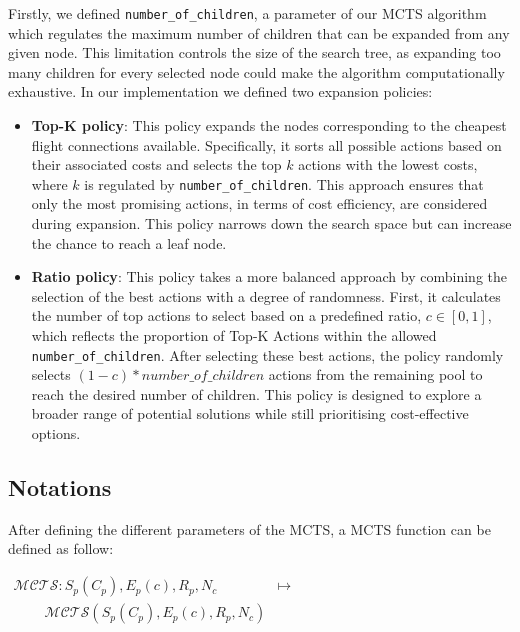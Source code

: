 \documentclass[conference]{IEEEtran}
\begin{document}
Firstly, we defined \texttt{number\_of\_children}, a parameter of our MCTS algorithm which regulates the maximum number of children that can be expanded from any given node. This limitation controls the size of the search tree, as expanding too many children for every selected node could make the algorithm computationally exhaustive. In our implementation we defined two expansion policies:

\begin{itemize}
    \item \textbf{Top-K policy}: This policy expands the nodes corresponding to the cheapest flight connections available. Specifically, it sorts all possible actions based on their associated costs and selects the top \(k\) actions with the lowest costs, where \(k\) is regulated by \texttt{number\_of\_children}. This approach ensures that only the most promising actions, in terms of cost efficiency, are considered during expansion. This policy narrows down the search space but can increase the chance to reach a leaf node.
    \item \textbf{Ratio policy}: This policy takes a more balanced approach by combining the selection of the best actions with a degree of randomness. First, it calculates the number of top actions to select based on a predefined ratio, \(c \in [0,1]\), which reflects the proportion of Top-K Actions within the allowed \texttt{number\_of\_children}. After selecting these best actions, the policy randomly selects $(1-c)*number\_of\_children$ actions from the remaining pool to reach the desired number of children. This policy is designed to explore a broader range of potential solutions while still prioritising cost-effective options.
\end{itemize}

\subsection{Notations}
\label{sub:notations}

After defining the different parameters of the MCTS, a MCTS function can be defined as follow:

\begin{center}
    \centering
    $\begin{array}{cc}
            \mathcal{MCTS} : S_p(C_p), E_p(c), R_p, N_c & \mapsto \\ ~~~~~~~~~~ \mathcal{MCTS}(S_p(C_p), E_p(c), R_p, N_c) \\
        \end{array}$
\end{center}
\end{document}
